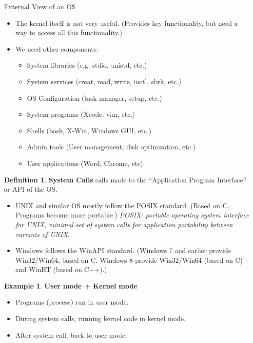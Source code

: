 \documentclass[12pt,a4paper]{article}
\theoremstyle{definition}
\newtheorem{definition}{Definition}[section]
\newtheorem{example}{Example}[section]
\newenvironment{myitemize}
{ \begin{itemize}
    \setlength{\itemsep}{5pt}
    \setlength{\parskip}{0pt}
    \setlength{\parsep}{0pt}     }
{ \end{itemize}                  }
\begin{document}
\begin{tcolorbox}
	\textsf{External View of an OS}
	\begin{myitemize}
		\item The kernel itself is not very useful. (Provides key functionality, but need a way to access all this functionality.)
		\item We need other components:
		\begin{myitemize}
			\item System libraries (e.g. stdio, unistd, etc.)
			\item System services (creat, read, write, ioctl, sbrk, etc.)
			\item OS Configuration (task manager, setup, etc.)
			\item System programs (Xcode, vim, etc.)
			\item Shells (bash, X-Win, Windows GUI, etc.)
			\item Admin tools (User management, disk optimization, etc.)
			\item User applications (Word, Chrome, etc).
		\end{myitemize}
	\end{myitemize}
	
\end{tcolorbox}

\begin{definition}{\textbf{System Calls}}
	calls made to the “Application Program Interface” or API of the OS.
	\begin{myitemize}
		\item UNIX  and similar OS mostly follow the POSIX standard. (Based on C. Programs become more portable.) \textit{POSIX: portable operating system interface for UNIX, minimal set of system calls for application portability between variants of UNIX}.
		\item Windows follows the WinAPI standard. (Windows 7 and earlier provide Win32/Win64, based on C.
Windows 8 provide Win32/Win64 (based on C) and WinRT (based on C++).)
	\end{myitemize}
\end{definition}

\begin{example}{\textbf{User mode + Kernel mode}}
	\begin{myitemize}
		\item Programs (process) run in user mode.
		\item During system calls, running kernel code in kernel mode.
		\item After system call, back to user mode.
	\end{myitemize}
\end{example}
\end{document}
